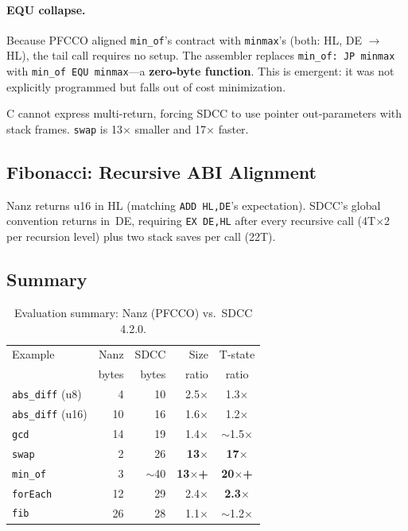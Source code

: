 \documentclass[sigplan,screen,nonacm]{acmart}
\begin{document}
\paragraph{EQU collapse.}
Because PFCCO aligned \texttt{min\_of}'s contract with \texttt{minmax}'s
(both: HL, DE $\to$ HL), the tail call requires no setup.  The assembler
replaces \texttt{min\_of:~JP~minmax} with \texttt{min\_of~EQU~minmax}---a
\textbf{zero-byte function}.  This is emergent: it was not explicitly
programmed but falls out of cost minimization.

C cannot express multi-return, forcing SDCC to use pointer out-parameters
with stack frames.  \texttt{swap} is 13$\times$ smaller and 17$\times$
faster.

\subsection{Fibonacci: Recursive ABI Alignment}

Nanz returns u16 in HL (matching \texttt{ADD~HL,DE}'s expectation).
SDCC's global convention returns in~DE, requiring \texttt{EX~DE,HL} after
every recursive call (4T$\times$2 per recursion level) plus two stack saves
per call (22T).

\subsection{Summary}

\begin{table}[h]
\centering\small
\caption{Evaluation summary: Nanz (PFCCO) vs.\ SDCC 4.2.0.}
\label{tab:summary}
\begin{tabular}{@{}lrrrc@{}}
\toprule
Example & Nanz & SDCC & Size & T-state \\
        & bytes & bytes & ratio & ratio \\
\midrule
\texttt{abs\_diff} (u8)  & 4  & 10 & 2.5$\times$ & 1.3$\times$ \\
\texttt{abs\_diff} (u16) & 10 & 16 & 1.6$\times$ & 1.2$\times$ \\
\texttt{gcd}             & 14 & 19 & 1.4$\times$ & $\sim$1.5$\times$ \\
\texttt{swap}            & 2  & 26 & \textbf{13$\times$}  & \textbf{17$\times$} \\
\texttt{min\_of}         & 3  & $\sim$40 & \textbf{13$\times$+} & \textbf{20$\times$+} \\
\texttt{forEach}         & 12 & 29 & 2.4$\times$ & \textbf{2.3$\times$} \\
\texttt{fib}             & 26 & 28 & 1.1$\times$ & $\sim$1.2$\times$ \\
\bottomrule
\end{tabular}
\end{table}
\end{document}
